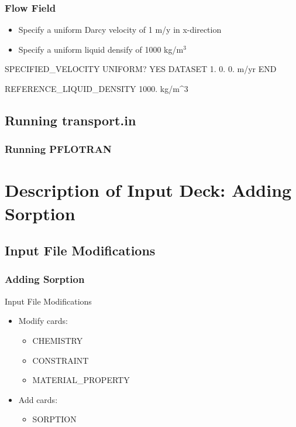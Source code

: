 \documentclass{beamer}
\begin{document}
\begin{frame}[fragile]\frametitle{Flow Field}

\begin{itemize}
\item Specify a uniform Darcy velocity of 1 m/y in x-direction
\item Specify a uniform liquid densify of 1000 kg/m$^3$
\end{itemize}


\begin{semiverbatim}

SPECIFIED_VELOCITY
  UNIFORM? YES
  DATASET 1. 0. 0. m/yr
END

REFERENCE_LIQUID_DENSITY 1000. kg/m^3
\end{semiverbatim}

\end{frame}

\subsection{Running transport.in}

\begin{frame}[fragile]\frametitle{Running PFLOTRAN}


\end{frame}

\section{Description of Input Deck: Adding Sorption}

\subsection{Input File Modifications}

\begin{frame}[fragile]\frametitle{Adding Sorption}

Input File Modifications
\begin{itemize}
\item Modify cards:
  \begin{itemize}
    \item CHEMISTRY
    \item CONSTRAINT
    \item MATERIAL\_PROPERTY
   \end{itemize}
\item Add cards:
  \begin{itemize}
    \item SORPTION
  \end{itemize}
\end{itemize}

\end{frame}
\end{document}
